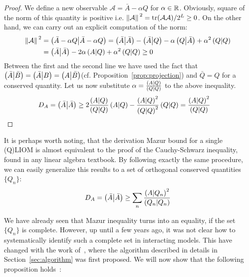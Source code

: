 \begin{proof}
  We define a new observable \(\mathcal{A} = \bar{A} - \alpha Q\) for \(\alpha \in \mathbb{R}\).
  Obviously, square of the norm of this quantity is positive i.e. \(\norm*{\mathcal{A}}^2 = 
  \tr(\mathcal{A}\mathcal{A})/2^L \geq 0\). On the other hand, we can carry out an
  explicit computation of the norm:
  \begin{align*}
  \norm*{\mathcal{A}}^2 &= \left(\bar{A}-\alpha Q \middle| \bar{A}-\alpha Q\right) = \left(\bar{A} \middle| \bar{A}\right) - 
  \left(\bar{A} \middle| Q\right) - \alpha \left(Q \middle| \bar{A}\right) + \alpha^2 \left(Q \middle| Q\right) \\
  &= \left(\bar{A} \middle| \bar{A}\right) - 2\alpha \left(A \middle| Q\right) + \alpha^2 \left(Q \middle| Q\right) \geq 0
  \end{align*}
  Between the first and the second line we have used the fact that \(\left(\bar{A} \middle| \bar{B}\right) = 
  \left(\bar{A} \middle| B\right) = \left(A \middle| \bar{B}\right)\)(cf. Proposition~\ref{prop:projection}) and \(\bar{Q} = Q\) 
  for a conserved quantity. Let us now substitute \(\alpha = \frac{\left(A \middle| Q\right)}{\left(Q \middle| Q\right)}\) to the
  above inequality.
  \begin{align*}
    D_A = \left(\bar{A} \middle| \bar{A}\right) &\geq 2 \frac{\left(A \middle| Q\right)}{\left(Q \middle| Q\right)} \left(A \middle| Q\right) - \frac{\left(A \middle| Q\right)^2}{\left(Q \middle| Q\right)^2}\left(Q \middle| Q\right)
    = \frac{\left(A \middle| Q\right)^2}{\left(Q \middle| Q\right)}
  \end{align*}
  \label{proof:single mazur}  
\end{proof}
It is perhaps worth noting, that the derivation Mazur bound for a single (Q)LIOM is almost equivalent to the proof of
the Cauchy-Schwarz inequality, found in any linear algebra textbook. By following exactly the same procedure, 
we can easily generalize this results to a set of orthogonal conserved quantities \(\{Q_{n}\}\):
\begin{equation}
  D_A = \left(\bar{A} \middle| \bar{A}\right) \geq \sum_{n} \frac{\left(A \middle| Q_n\right)^2}{\left(Q_n \middle| Q_n\right)}
\end{equation}

We have already seen that Mazur inequality turns into an equality, if the set \(\{Q_n\}\) is complete. However,
up until a few years ago, it was not clear how to systematically identify such a complete set in interacting models.
This have changed with the work of~\textcite{Mierzejewski2015a}, where the algorithm described in details
in Section~\ref{sec:algorithm} was first proposed. We will now show that the following proposition holds~\autocite{Mierzejewski2015Approx}:

